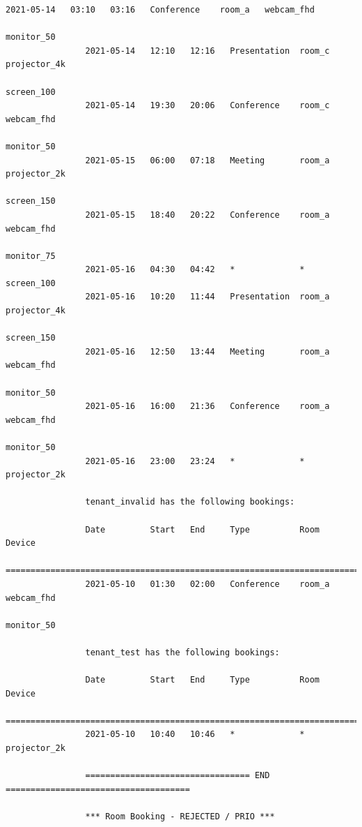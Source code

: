 \documentclass{article}
\begin{document}
\begin{Verbatim}[gobble=8]
                2021-05-14   03:10   03:16   Conference    room_a   webcam_fhd
                                                                    monitor_50
                2021-05-14   12:10   12:16   Presentation  room_c   projector_4k
                                                                    screen_100
                2021-05-14   19:30   20:06   Conference    room_c   webcam_fhd
                                                                    monitor_50
                2021-05-15   06:00   07:18   Meeting       room_a   projector_2k
                                                                    screen_150
                2021-05-15   18:40   20:22   Conference    room_a   webcam_fhd
                                                                    monitor_75
                2021-05-16   04:30   04:42   *             *        screen_100
                2021-05-16   10:20   11:44   Presentation  room_a   projector_4k
                                                                    screen_150
                2021-05-16   12:50   13:44   Meeting       room_a   webcam_fhd
                                                                    monitor_50
                2021-05-16   16:00   21:36   Conference    room_a   webcam_fhd
                                                                    monitor_50
                2021-05-16   23:00   23:24   *             *        projector_2k
                
                tenant_invalid has the following bookings:
                
                Date         Start   End     Type          Room     Device
                ===========================================================================
                2021-05-10   01:30   02:00   Conference    room_a   webcam_fhd
                                                                    monitor_50
                
                tenant_test has the following bookings:
                
                Date         Start   End     Type          Room     Device
                ===========================================================================
                2021-05-10   10:40   10:46   *             *        projector_2k
                
                ================================= END =====================================
                
                *** Room Booking - REJECTED / PRIO ***
                

\end{Verbatim}
\end{document}
